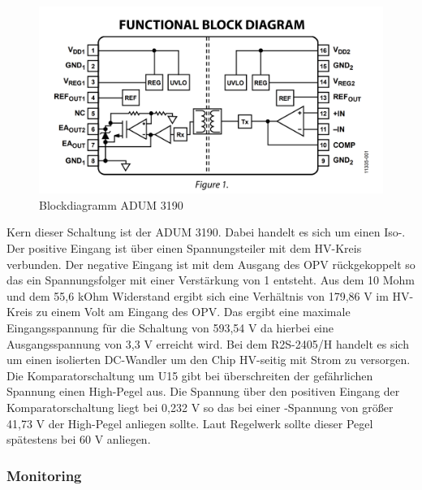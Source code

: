 \begin{figure}
	\centering
	\includegraphics[width=0.4\linewidth]{"bilder/Blockdiagramm ADUM3190"}
	\caption{Blockdiagramm ADUM 3190}
	\label{fig:blockdiagramm-adum3190}
\end{figure}

Kern dieser Schaltung ist der ADUM 3190. Dabei handelt es sich um einen Iso-. Der positive Eingang ist über einen Spannungsteiler mit dem \ac{HV}-Kreis verbunden. Der negative Eingang ist mit dem Ausgang des \ac{OPV} rückgekoppelt so das ein Spannungsfolger mit einer Verstärkung von 1 entsteht. Aus dem 10 Mohm und dem 55,6 kOhm Widerstand ergibt sich eine Verhältnis von 179,86 V im \ac{HV}-Kreis zu einem Volt am Eingang des \ac{OPV}. Das ergibt eine maximale Eingangsspannung für die Schaltung von 593,54 V da hierbei eine Ausgangsspannung von 3,3 V erreicht wird. Bei dem R2S-2405/H handelt es sich um einen isolierten DC-Wandler um den Chip \ac{HV}-seitig mit Strom zu versorgen. Die Komparatorschaltung um U15 gibt bei überschreiten der gefährlichen Spannung einen High-Pegel aus. Die Spannung über den positiven Eingang der Komparatorschaltung liegt bei 0,232 V so das bei einer -Spannung von größer 41,73 V der High-Pegel anliegen sollte. Laut Regelwerk sollte dieser Pegel spätestens bei 60 V anliegen.

\FloatBarrier
\subsubsection{ Monitoring}

